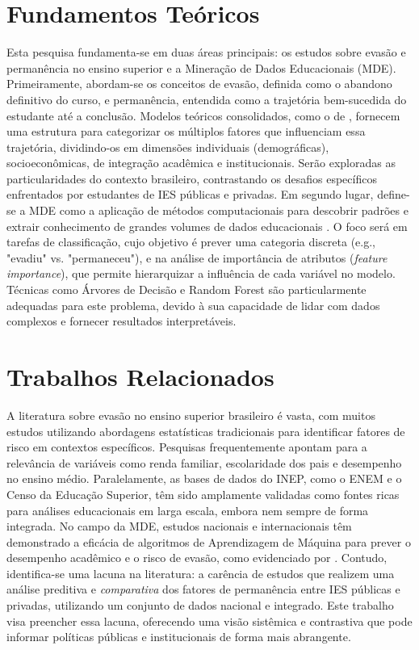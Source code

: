 \documentclass[english, brazilian]{RBIEarticle}
\begin{document}
\section{Fundamentos Teóricos}
Esta pesquisa fundamenta-se em duas áreas principais: os estudos sobre evasão e permanência no ensino superior e a Mineração de Dados Educacionais (MDE). Primeiramente, abordam-se os conceitos de evasão, definida como o abandono definitivo do curso, e permanência, entendida como a trajetória bem-sucedida do estudante até a conclusão. Modelos teóricos consolidados, como o de \textcite{Tinto1975}, fornecem uma estrutura para categorizar os múltiplos fatores que influenciam essa trajetória, dividindo-os em dimensões individuais (demográficas), socioeconômicas, de integração acadêmica e institucionais. Serão exploradas as particularidades do contexto brasileiro, contrastando os desafios específicos enfrentados por estudantes de IES públicas e privadas. Em segundo lugar, define-se a MDE como a aplicação de métodos computacionais para descobrir padrões e extrair conhecimento de grandes volumes de dados educacionais \parencite{Han2011}. O foco será em tarefas de classificação, cujo objetivo é prever uma categoria discreta (e.g., "evadiu" vs. "permaneceu"), e na análise de importância de atributos (\textit{feature importance}), que permite hierarquizar a influência de cada variável no modelo. Técnicas como Árvores de Decisão e Random Forest são particularmente adequadas para este problema, devido à sua capacidade de lidar com dados complexos e fornecer resultados interpretáveis.

\section{Trabalhos Relacionados}
A literatura sobre evasão no ensino superior brasileiro é vasta, com muitos estudos utilizando abordagens estatísticas tradicionais para identificar fatores de risco em contextos específicos. Pesquisas frequentemente apontam para a relevância de variáveis como renda familiar, escolaridade dos pais e desempenho no ensino médio. Paralelamente, as bases de dados do INEP, como o ENEM e o Censo da Educação Superior, têm sido amplamente validadas como fontes ricas para análises educacionais em larga escala, embora nem sempre de forma integrada. No campo da MDE, estudos nacionais e internacionais têm demonstrado a eficácia de algoritmos de Aprendizagem de Máquina para prever o desempenho acadêmico e o risco de evasão, como evidenciado por \textcite{Rodrigues2021}. Contudo, identifica-se uma lacuna na literatura: a carência de estudos que realizem uma análise preditiva e \textit{comparativa} dos fatores de permanência entre IES públicas e privadas, utilizando um conjunto de dados nacional e integrado. Este trabalho visa preencher essa lacuna, oferecendo uma visão sistêmica e contrastiva que pode informar políticas públicas e institucionais de forma mais abrangente.
\end{document}

